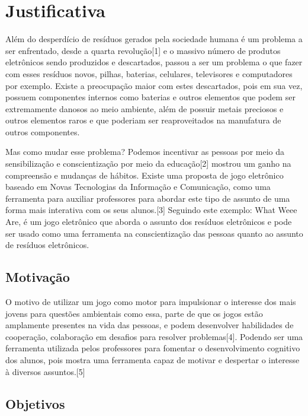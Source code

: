 
\chapter*[Justificativa]{Justificativa}

Além do desperdício de resíduos gerados pela sociedade humana é um problema a ser enfrentado, desde a quarta revolução[1] e o massivo número de produtos eletrônicos sendo produzidos e descartados, passou a ser um problema o que fazer com esses resíduos novos, pilhas, baterias, celulares, televisores e computadores por exemplo. Existe a preocupação maior com estes descartados, pois em sua vez, possuem componentes internos como baterias e outros elementos que podem ser extremamente danosos ao meio ambiente, além de possuir metais preciosos e outros elementos raros e que poderiam ser reaproveitados na manufatura de outros componentes.

Mas como mudar esse problema? Podemos incentivar as pessoas por meio da sensibilização e conscientização por meio da educação[2] mostrou um ganho na compreensão e mudanças de hábitos. Existe uma proposta de jogo eletrônico baseado em Novas Tecnologias da Informação e Comunicação, como uma ferramenta para auxiliar professores para abordar este tipo de assunto de uma forma mais interativa com os seus alunos.[3] Seguindo este exemplo: What Weee Are, é um jogo eletrônico que aborda o assunto dos resíduos eletrônicos e pode ser usado como uma ferramenta na conscientização das pessoas quanto ao assunto de resíduos eletrônicos.


\section*{Motivação}\label{sec:motivacao}

O motivo de utilizar um jogo como motor para impulsionar o interesse dos mais jovens para questões ambientais como essa, parte de que os jogos estão amplamente presentes na vida das pessoas, e podem desenvolver habilidades de cooperação, colaboração em desafios para resolver problemas[4]. Podendo ser uma ferramenta utilizada pelos professores para fomentar o desenvolvimento cognitivo dos alunos, pois mostra uma ferramenta capaz de motivar e despertar o interesse à diversos assuntos.[5]

\section*{Objetivos}\label{sec:objetivos}

\lipsum[36]
